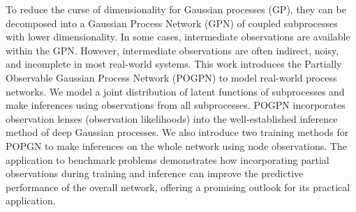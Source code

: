 To reduce the curse of dimensionality for Gaussian processes (GP), they can be decomposed into a Gaussian Process Network (GPN) of coupled subprocesses with lower dimensionality. In some cases, intermediate observations are available within the GPN. However, intermediate observations are often indirect, noisy, and incomplete in most real-world systems. This work introduces the Partially Observable Gaussian Process Network (POGPN) to model real-world process networks. We model a joint distribution of latent functions of subprocesses and make inferences using observations from all subprocesses. POGPN incorporates observation lenses (observation likelihoods) into the well-established inference method of deep Gaussian processes. We also introduce two training methods for POPGN to make inferences on the whole network using node observations. The application to benchmark problems demonstrates how incorporating partial observations during training and inference can improve the predictive performance of the overall network, offering a promising outlook for its practical application.
